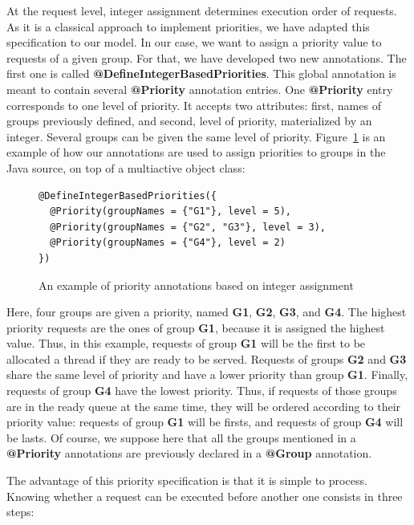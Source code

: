 \documentclass[11pt]{report}
\begin{document}
At the request level, integer assignment determines execution order of requests. As it is a classical approach to implement priorities, we have adapted this specification to our model. In our case, we want to assign a priority value to requests of a given group. For that, we have developed two new annotations. The first one is called \textbf{@DefineIntegerBasedPriorities}. This global annotation is meant to contain several \textbf{@Priority} annotation entries. One \textbf{@Priority} entry corresponds to one level of priority. It accepts two attributes: first, names of groups previously defined, and second, level of priority, materialized by an integer. Several groups can be given the same level of priority. Figure~\ref{integer_priority_annotation} is an example of how our annotations are used to assign priorities to groups in the Java source, on top of a multiactive object class:

\begin{figure}[!ht]
	\lstset{language=java, numbers=left, numberstyle=\tiny, stepnumber=1, numbersep=5pt, basicstyle=\footnotesize}
	\begin{lstlisting}[frame=single]
@DefineIntegerBasedPriorities({
  @Priority(groupNames = {"G1"}, level = 5),
  @Priority(groupNames = {"G2", "G3"}, level = 3),
  @Priority(groupNames = {"G4"}, level = 2)
})
 	\end{lstlisting}
\caption{An example of priority annotations based on integer assignment}
\label{integer_priority_annotation}
\end{figure}

Here, four groups are given a priority, named \textbf{G1}, \textbf{G2}, \textbf{G3}, and \textbf{G4}. The highest priority requests are the ones of group \textbf{G1}, because it is assigned the highest value. Thus, in this example, requests of group \textbf{G1} will be the first to be allocated a thread if they are ready to be served. Requests of groups \textbf{G2} and \textbf{G3} share the same level of priority and have a lower priority than group \textbf{G1}. Finally, requests of group \textbf{G4} have the lowest priority. Thus, if requests of those groups are in the ready queue at the same time, they will be ordered according to their priority value: requests of group \textbf{G1} will be firsts, and requests of group \textbf{G4} will be lasts.
Of course, we suppose here that all the groups mentioned in a \textbf{@Priority} annotations are previously declared in a \textbf{@Group} annotation. 

The advantage of this priority specification is that it is simple  to process. Knowing whether a request can be executed before another one consists in three steps:
\end{document}
